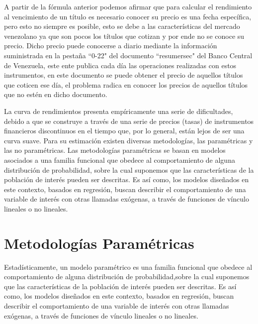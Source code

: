 \hspace*{0.4 cm}A partir de la f\'ormula anterior podemos afirmar que para calcular el rendimiento al vencimiento de un t\'itulo es necesario conocer su precio es una fecha espec\'ifica, pero esto no siempre es posible, esto se debe a las caracter\'isticas del mercado venezolano ya que son pocos los t\'itulos que cotizan y por ende no se conoce su precio. Dicho precio puede conocerse a diario mediante la informaci\'on suministrada en la pesta\~na ``0-22" del documento ``resumersec" del Banco Central de Venezuela, este ente publica cada d\'ia las operaciones realizadas con estos instrumentos, en este documento se puede obtener el precio de aquellos t\'itulos que coticen ese d\'ia, el problema radica en conocer los precios de aquellos t\'itulos que no est\'en en dicho documento.



\vspace{0.5cm}

\hspace*{0.4 cm} La curva de rendimientos presenta emp\'iricamente una serie de dificultades, debido a que se construye a trav\'es de una serie de precios (tasas) de instrumentos financieros discontinuos en el tiempo que, por lo general, est\'an lejos de ser una curva suave. Para su estimaci\'on existen diversas metodolog\'ias, las param\'etricas y las no param\'etricas. Las metodolog\'ias param\'etricas se basan en modelos asociados a una familia funcional que obedece al comportamiento de alguna distribuci\'on de probabilidad, sobre la cual suponemos que las caracter\'isticas de la poblaci\'on de inter\'es pueden ser descritas. Es as\'i como, los modelos dise\~nados en este contexto, basados en regresi\'on, buscan describir el comportamiento de una variable de inter\'es con otras llamadas ex\'ogenas, a trav\'es de funciones de v\'inculo lineales o no lineales.


\section{Metodolog\'ias Param\'etricas}

\hspace*{0.4 cm} Estad\'isticamente, un modelo param\'etrico es una familia funcional que
obedece al comportamiento de alguna distribuci\'on de probabilidad,sobre la cual suponemos que las caracter\'isticas de la poblaci\'on de inter\'es
pueden ser descritas. Es as\'i como, los modelos dise\~nados en este contexto,
basados en regresi\'on, buscan describir el comportamiento de una
variable de inter\'es con otras llamadas ex\'ogenas, a trav\'es de funciones de
v\'inculo lineales o no lineales.

